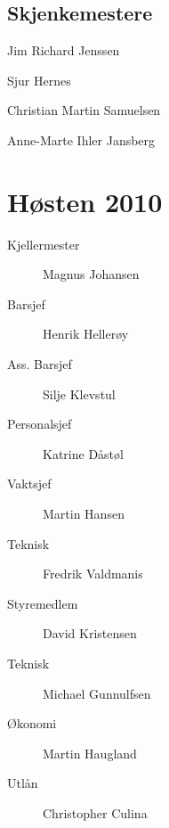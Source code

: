 \subsection*{Skjenkemestere}

\begin{description}
	\item Jim Richard Jenssen
	\item Sjur Hernes
	\item Christian Martin Samuelsen
	\item Anne-Marte Ihler Jansberg
\end{description}

\section*{Høsten 2010}

\begin{description}
	\item[Kjellermester] Magnus Johansen
	\item[Barsjef] Henrik Hellerøy
 	\item[Ass. Barsjef] Silje Klevstul
	\item[Personalsjef] Katrine Dåstøl
	\item[Vaktsjef] Martin Hansen
	\item[Teknisk] Fredrik Valdmanis
	\item[Styremedlem] David Kristensen
	\item[Teknisk] Michael Gunnulfsen
	\item[Økonomi] Martin Haugland
	\item[Utlån] Christopher Culina
\end{description}